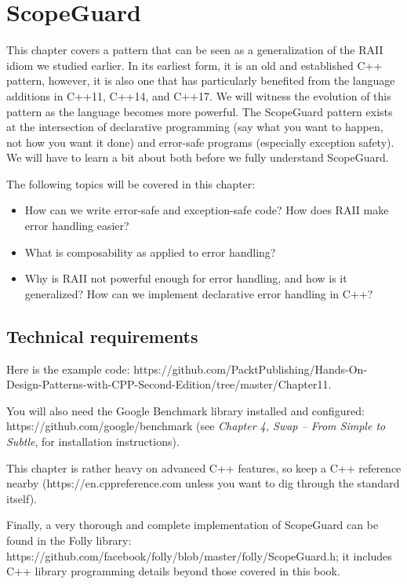 ﻿\chapter{ScopeGuard}

This chapter covers a pattern that can be seen as a generalization of the RAII idiom we studied earlier. In its earliest form, it is an old and established C++ pattern, however, it is also one that has particularly benefited from the language additions in C++11, C++14, and C++17. We will witness the evolution of this pattern as the language becomes more powerful. The ScopeGuard pattern exists at the intersection of declarative programming (say what you want to happen, not how you want it done) and error-safe programs (especially exception safety). We will have to learn a bit about both before we fully understand ScopeGuard.

The following topics will be covered in this chapter:

\begin{itemize}
\item
  How can we write error-safe and exception-safe code? How does RAII make error handling easier?
\item
  What is composability as applied to error handling?
\item
  Why is RAII not powerful enough for error handling, and how is it generalized? How can we implement declarative error handling in C++?
\end{itemize}

\section{Technical requirements}

Here is the example code: https://github.com/PacktPublishing/Hands-On-Design-Patterns-with-CPP-Second-Edition/tree/master/Chapter11.

You will also need the Google Benchmark library installed and configured: https://github.com/google/benchmark (see \emph{Chapter 4, Swap -- From Simple to Subtle}, for installation instructions).

This chapter is rather heavy on advanced C++ features, so keep a C++ reference nearby (https://en.cppreference.com unless you want to dig through the standard itself).

Finally, a very thorough and complete implementation of ScopeGuard can be found in the Folly library: https://github.com/facebook/folly/blob/master/folly/ScopeGuard.h{}; it includes C++ library programming details beyond those covered in this book.

